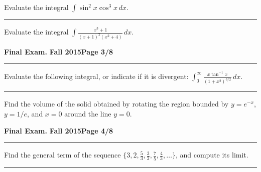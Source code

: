 \documentclass[12pt]{article}
\theoremstyle{definition}
\begin{document}
{\problem[5 pts] Evaluate the integral $\displaystyle{\int
    \sin^2 x \cos^3 x\, dx}$.
\vspace{3.5cm}
\begin{flushright}
\end{flushright}
\hrule

{\problem[5 pts] Evaluate the integral $\displaystyle{\int \frac{x^3+1}{(x+1)^2(x^2+4)}\, dx}$.}
\vspace{4.4cm}
\begin{flushright}
\end{flushright}
\newpage


\hfill{\large\bf Final Exam.}\hfill{\large\bf
  Fall 2015}\hfill{\large\bf Page 3/8}\hrule

\bigskip
{\problem[5 pts] Evaluate the following integral, or indicate if it is
divergent: $\displaystyle{\int_0^\infty \frac{x \tan^{-1}x}{(1+x^2)^{3/2}}\,
dx}$.}
\vspace{8cm}
\begin{flushright}
\end{flushright}
\hrule

{\problem [5 pts] Find the volume of the solid obtained by rotating the region bounded by $y=e^{-x}$, $y=1/e$, and $x=0$ around the line $y=0$.}
\vspace{8cm}
\begin{flushright}
\end{flushright}

\newpage

\hfill{\large\bf Final Exam.}\hfill{\large\bf
  Fall 2015}\hfill{\large\bf Page 4/8}\hrule

\bigskip
{\problem[5 pts] Find the general term of the sequence $\big\{
  3,2,\frac{5}{3}, \frac{3}{2}, \frac{7}{5}, \frac{4}{3}, \dotsc
  \big\}$, and compute its limit.}
\vspace{3cm}
\begin{flushright}
\end{flushright}
\hrule

}
\end{document}
